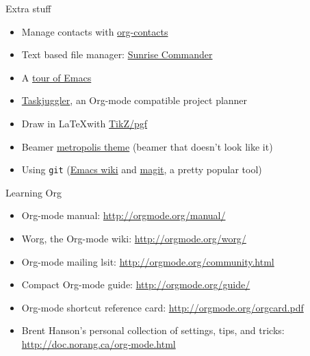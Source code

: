 \documentclass[aspectratio=169,presentation,bigger,fleqn,t]{beamer}
\begin{document}
\begin{frame}[fragile,label={sec:orgheadline24}]{Extra stuff}
 \begin{itemize}
\item Manage contacts with \href{https://julien.danjou.info/projects/emacs-packages#org-contacts}{org-contacts}
\item Text based file manager: \href{http://www.emacswiki.org/emacs/Sunrise_Commander}{Sunrise Commander}
\item A \href{http://www.gnu.org/software/emacs/tour/}{tour of Emacs}
\item \href{http://www.taskjuggler.org/}{Taskjuggler}, an Org-mode compatible project planner
\item Draw in \LaTeX with \href{http://www.texample.net/tikz/}{TikZ/pgf}
\item Beamer \href{https://github.com/matze/mtheme}{metropolis theme} (beamer that doesn't look like it)
\item Using \texttt{git} (\href{http://www.emacswiki.org/emacs/Git}{Emacs wiki} and \href{https://github.com/magit/magit}{magit}, a pretty popular tool)
\end{itemize}
\end{frame}

\begin{frame}[label={sec:orgheadline25}]{Learning Org}
\begin{itemize}
\item Org-mode manual: \url{http://orgmode.org/manual/}
\item Worg, the Org-mode wiki: \url{http://orgmode.org/worg/}
\item Org-mode mailing lsit: \url{http://orgmode.org/community.html}
\item Compact Org-mode guide: \url{http://orgmode.org/guide/}
\item Org-mode shortcut reference card: \url{http://orgmode.org/orgcard.pdf}
\item Brent Hanson's personal collection of settings, tips, and tricks: \url{http://doc.norang.ca/org-mode.html}
\end{itemize}
\end{frame}
\end{document}
